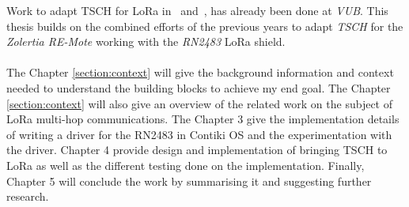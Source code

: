 Work to adapt TSCH for LoRa in~\cite{8847137} and~\cite{njomgang_2018}, has
already been done at \emph{VUB}.
This thesis builds on the combined efforts of the previous
years to adapt \emph{TSCH} for the \emph{Zolertia RE-Mote} working with the
\emph{RN2483} LoRa shield.

\paragraph{}

The Chapter \ref{section:context} will give the background information and context needed to
understand the building blocks to achieve my end goal.
The Chapter \ref{section:context} will also give an overview of the related work on the subject of
LoRa multi-hop communications.
The Chapter 3 give the implementation details of writing a driver for the
RN2483 in Contiki OS and the experimentation with the driver.
Chapter 4 provide design and implementation of bringing TSCH to LoRa as well as
the different testing done on the implementation.
Finally, Chapter 5 will conclude the work by summarising it and suggesting
further research.
